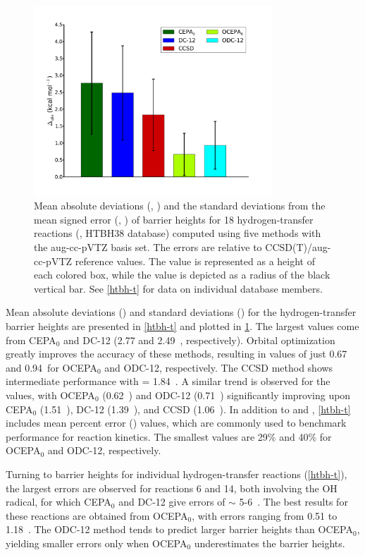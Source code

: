 \begin{figure}[hb!]
	\centering
	\caption{%
        \label{htbh-f}
        Mean absolute deviations (\mae, \kcal) and the standard deviations from
        the mean signed error (\std, \kcal) of barrier heights for 18
        hydrogen-transfer reactions (,
        HTBH38 database) computed using five methods with the aug-cc-pVTZ basis
        set.
        The errors are relative to CCSD(T)/aug-cc-pVTZ reference values.
        The \mae value is represented as a height of each colored box, while the
        \std value is depicted as a radius of the black vertical bar.
        See \cref{htbh-t} for data on individual database members.
	}
	\includegraphics[width=0.8\textwidth]{figures/htbh.pdf}
\end{figure}

Mean absolute deviations (\mae) and standard deviations (\std) for the
hydrogen-transfer barrier heights are presented in \cref{htbh-t} and plotted in
\cref{htbh-f}.
The largest \mae values come from CEPA$_0$ and DC-12 (2.77 and 2.49~\kcal,
respectively).
Orbital optimization greatly improves the accuracy of these methods, resulting
in \mae values of just 0.67 and 0.94~\kcal for OCEPA$_0$ and ODC-12,
respectively.
The CCSD method shows intermediate performance with \mae = 1.84~\kcal.
A similar trend is observed for the \std values, with OCEPA$_0$ (0.62~\kcal) and
ODC-12 (0.71~\kcal) significantly improving upon CEPA$_0$ (1.51~\kcal), DC-12
(1.39~\kcal), and CCSD (1.06~\kcal).
In addition to \mae and \std, \cref{htbh-t} includes mean percent error (\rel)
values, which are commonly used to benchmark performance for reaction kinetics.
The smallest \rel values are 29\% and 40\% for OCEPA$_0$ and ODC-12,
respectively.

Turning to barrier heights for individual hydrogen-transfer reactions
(\cref{htbh-t}), the largest errors are observed for reactions 6 and 14, both
involving the OH radical, for which CEPA$_0$ and DC-12 give errors of $\sim$
5-6~\kcal.
The best results for these reactions are obtained from OCEPA$_0$, with errors
ranging from 0.51 to 1.18~\kcal.
The ODC-12 method tends to predict larger barrier heights than OCEPA$_0$,
yielding smaller errors only when OCEPA$_0$ underestimates the barrier heights.


